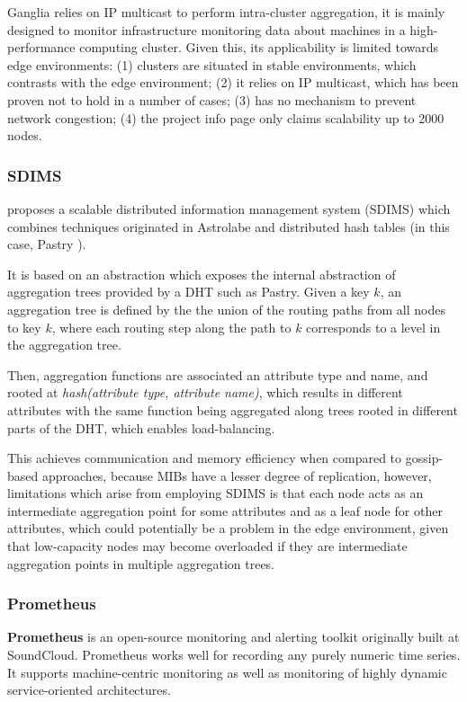 Ganglia relies on IP multicast to perform intra-cluster aggregation, it is mainly designed to monitor infrastructure monitoring data about machines in a high-performance computing cluster. Given this, its applicability is limited towards edge environments: (1) clusters are situated in stable environments, which contrasts with the edge environment; (2) it relies on IP multicast, which has been proven not to hold in a number of cases; (3) has no mechanism to prevent network congestion; (4) the project info page only claims scalability up to 2000 nodes.

\subsubsection{SDIMS}

\cite{SDIMS} proposes a scalable distributed information management system (SDIMS) which combines techniques originated in Astrolabe \cite{Renesse2003} and distributed hash tables (in this case, Pastry \cite{rowstron2001pastry}).

It is based on an abstraction which exposes the internal abstraction of aggregation trees provided by a DHT such as Pastry. Given a key $k$, an aggregation tree is defined by the the union of the routing paths from all nodes to key $k$, where each routing step along the path to $k$ corresponds to a level in the aggregation tree.

Then, aggregation functions are associated an attribute type and name, and rooted at \textit{hash(attribute type, attribute name)}, which results in different attributes with the same function being aggregated along trees rooted in different parts of the DHT, which enables load-balancing.

This achieves communication and memory efficiency when compared to gossip-based approaches, because MIBs have a lesser degree of replication, however, limitations which arise from employing SDIMS is that each node acts as an intermediate aggregation point for some attributes and as a leaf node for other attributes, which could potentially be a problem in the edge environment, given that low-capacity nodes may become overloaded if they are intermediate aggregation points in multiple aggregation trees. 

\subsubsection{Prometheus}

\textbf{Prometheus} \cite{prometheus} is an open-source monitoring and alerting toolkit originally built at SoundCloud. Prometheus works well for recording any purely numeric time series. It supports machine-centric monitoring as well as monitoring of highly dynamic service-oriented architectures. 

